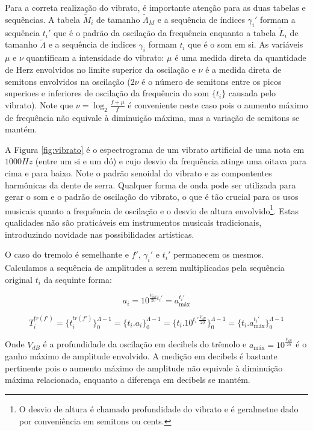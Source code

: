 Para a correta realização do vibrato, é importante atenção para as duas tabelas e sequências.
A tabela $\widetilde{M}_i$ de tamanho $\widetilde{\Lambda}_M$ e a sequência de índices $\gamma_i'$ formam a sequência $t_i'$
 que é o padrão da oscilação da frequência enquanto
a tabela $\widetilde{L}_i$ de tamanho $\widetilde{\Lambda}$ e a sequência de índices $\gamma_i$ formam $t_i$ que é o som em si.
As variáveis $\mu$ e $\nu$ quantificam a intensidade do vibrato: $\mu$ é uma medida direta da quantidade
de Herz envolvidos no limite superior da oscilação e $\nu$ é a medida direta de semitons envolvidos na oscilação ($2\nu$ é o número de semitons entre os picos superioes e inferiores de oscilação da frequência do som $\{t_i\}$ causada pelo vibrato).
Note que $\nu=\log_{2}\frac{f+\mu}{f} $ é conveniente neste caso pois o aumento máximo de frequência
não equivale à diminuição máxima, mas a variação de semitons se mantém.

A Figura \ref{fig:vibrato} é o espectrograma de um vibrato artificial de uma nota em
$1000Hz$ (entre um si e um dó) e cujo desvio da frequência atinge uma oitava
para cima e para baixo. Note o padrão senoidal do vibrato e as compontentes harmônicas
da dente de serra. Qualquer forma de onda pode
ser utilizada para gerar o som e o padrão de oscilação do vibrato, o que é tão crucial para os usos musicais quanto a
frequência de oscilação e o desvio de altura envolvido\footnote{O desvio de altura
é chamado profundidade do vibrato e é geralmetne dado por conveniência em semitons ou cents.}. Estas qualidades não são praticáveis em instrumentos musicais tradicionais, introduzindo novidade nas possibilidades artísticas.

O caso do tremolo é semelhante e $f'$, $\gamma_i'$ e $t_i'$ permanecem os mesmos. Calculamos
a sequência de amplitudes a serem multiplicadas pela sequência original $t_i$ da
sequinte forma:

\begin{equation}\label{trA}
a_i=10^{\frac{V_{dB}}{20}t_i' } = a_{\text{máx}}^{t_i'}
\end{equation}

\begin{equation}\label{trT}
T_i^{tr(f')}=\{ t_i^{tr(f')} \}_0^{\Lambda-1}=\{ t_i . a_i \}_0^{\Lambda-1}=\{t_i .10^{t_i' \frac{V_{dB}}{20}}    \}_0^{\Lambda-1}=\{t_i . a_{\text{máx}}^{t_i'}\}_0^{\Lambda-1}
\end{equation}

Onde $V_{dB}$ é a profundidade da oscilação em decibels do trêmolo e $a_{\text{máx}}=10^{\frac{V_{dB}}{20}}$
 é o ganho máximo de amplitude envolvido.
A medição em decibels é bastante pertinente pois o aumento máximo de amplitude
não equivale à diminuição máxima relacionada, enquanto a diferença em decibels se mantém.

